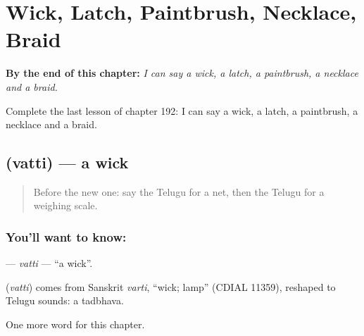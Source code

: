 
\chapter{Wick, Latch, Paintbrush, Necklace, Braid}
\label{ch:te-wick-latch-paintbrush-necklace-braid}

\begin{chapteropening}
\textbf{By the end of this chapter:} \emph{I can say a wick, a latch, a paintbrush, a necklace and a braid.}

Complete the last lesson of chapter 192: I can say a wick, a latch, a paintbrush, a necklace and a braid.
\end{chapteropening}

\section[\texorpdfstring{\te{వత్తి} (vatti)}{వత్తి (vatti)}]{ (vatti) — a wick}

\label{lesson:TE-C192-vatti}



\begin{quote}
Before the new one: say the Telugu for a net, then the Telugu for a weighing scale.
\end{quote}

\subsection*{You'll want to know: }
\textbf{} — \emph{vatti} — \textquotedblleft{}a wick\textquotedblright{}.

\begin{cousinweb}
\textbf{} (\emph{vatti}) comes from Sanskrit \emph{varti}, \textquotedblleft{}wick; lamp\textquotedblright{} (CDIAL 11359), reshaped to Telugu sounds: a tadbhava.
\end{cousinweb}

\begin{grammarlens}[title={What you've built}]
One more word for this chapter.
\end{grammarlens}

